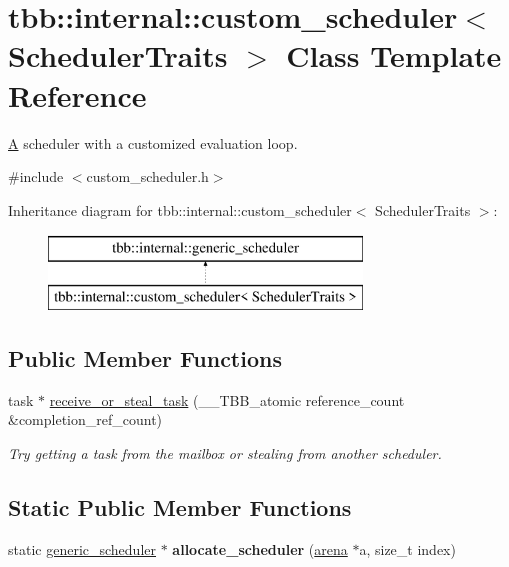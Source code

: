 \hypertarget{classtbb_1_1internal_1_1custom__scheduler}{}\section{tbb\+:\+:internal\+:\+:custom\+\_\+scheduler$<$ Scheduler\+Traits $>$ Class Template Reference}
\label{classtbb_1_1internal_1_1custom__scheduler}


\hyperlink{structA}{A} scheduler with a customized evaluation loop.  




{\ttfamily \#include $<$custom\+\_\+scheduler.\+h$>$}

Inheritance diagram for tbb\+:\+:internal\+:\+:custom\+\_\+scheduler$<$ Scheduler\+Traits $>$\+:\begin{figure}[H]
\begin{center}
\leavevmode
\includegraphics[height=2.000000cm]{classtbb_1_1internal_1_1custom__scheduler}
\end{center}
\end{figure}
\subsection*{Public Member Functions}
\begin{DoxyCompactItemize}
\item 
task $\ast$ \hyperlink{classtbb_1_1internal_1_1custom__scheduler_a71b54b3854eb6961a7b09678450dd470}{receive\+\_\+or\+\_\+steal\+\_\+task} (\+\_\+\+\_\+\+T\+B\+B\+\_\+atomic reference\+\_\+count \&completion\+\_\+ref\+\_\+count)
\begin{DoxyCompactList}\small\item\em Try getting a task from the mailbox or stealing from another scheduler. \end{DoxyCompactList}\end{DoxyCompactItemize}
\subsection*{Static Public Member Functions}
\begin{DoxyCompactItemize}
\item 
\hypertarget{classtbb_1_1internal_1_1custom__scheduler_ac1c24932c3bb2ec60955de5d2798a3c4}{}static \hyperlink{classtbb_1_1internal_1_1generic__scheduler}{generic\+\_\+scheduler} $\ast$ {\bfseries allocate\+\_\+scheduler} (\hyperlink{classtbb_1_1internal_1_1arena}{arena} $\ast$a, size\+\_\+t index)\label{classtbb_1_1internal_1_1custom__scheduler_ac1c24932c3bb2ec60955de5d2798a3c4}

\end{DoxyCompactItemize}


